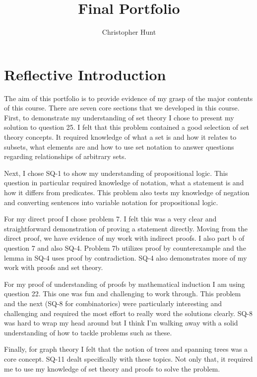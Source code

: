 \documentclass{article}
\title{Final Portfolio}
\author{Christopher Hunt}
\date{}
\begin{document}
\pagestyle{fancy}
\fancyhf{}
\rhead{\thepage}
\maketitle

\section*{Reflective Introduction}
The aim of this portfolio is to provide evidence of my grasp of the major contents of this course. There are seven core sections that we developed in this course. First, to demonstrate my understanding of set theory I chose to present my solution to question 25. I felt that this problem contained a good selection of set theory concepts. It required knowledge of what a set is and how it relates to subsets, what elements are and how to use set notation to answer questions regarding relationships of arbitrary sets. 

Next, I chose SQ-1 to show my understanding of propositional logic. This question in particular required knowledge of notation, what a statement is and how it differs from predicates. This problem also tests my knowledge of negation and converting sentences into variable notation for propositional logic. 

For my direct proof I chose problem 7. I felt this was a very clear and straightforward demonstration of proving a statement directly. Moving from the direct proof, we have evidence of my work with indirect proofs. I also part b of question 7 and also SQ-4. Problem 7b utilizes proof by counterexample and the lemma in SQ-4 uses proof by contradiction. SQ-4 also demonstrates more of my work with proofs and set theory.

For my proof of understanding of proofs by mathematical induction I am using question 22. This one was fun and challenging to work through. This problem and the next (SQ-8 for combinatorics) were particularly interesting and challenging and required the most effort to really word the solutions clearly. SQ-8 was hard to wrap my head around but I think I’m walking away with a solid understanding of how to tackle problems such as these.

Finally, for graph theory I felt that the notion of trees and spanning trees was a core concept. SQ-11 dealt specifically with these topics. Not only that, it required me to use my knowledge of set theory and proofs to solve the problem.
\end{document}
